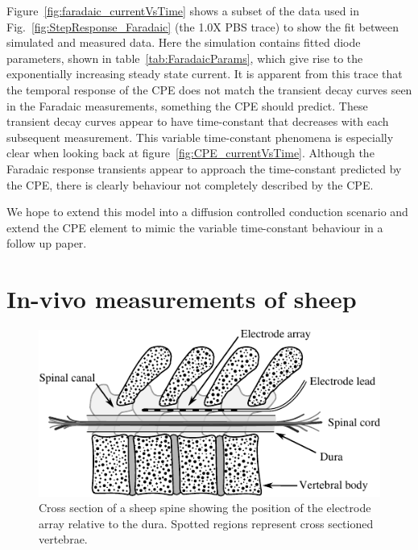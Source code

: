 \documentclass[journal, a4paper]{IEEEtran}
\begin{document}
{{
    \color{blue}
Figure~\ref{fig:faradaic_currentVsTime} shows a subset of the data used in Fig.~\ref{fig:StepResponse_Faradaic} (the 1.0X PBS trace) to show the fit between simulated and measured data. Here the simulation contains fitted diode parameters, shown in table~\ref{tab:FaradaicParams}, which give rise to the exponentially increasing steady state current.
It is apparent from this trace that the temporal response of the CPE does not match the transient decay curves seen in the Faradaic measurements, something the CPE should predict. These transient decay curves appear to have time-constant that decreases with each subsequent measurement. This variable time-constant phenomena is especially clear when looking back at figure~\ref{fig:CPE_currentVsTime}. Although the Faradaic response transients appear to approach the time-constant predicted by the CPE, there is clearly behaviour not completely described by the CPE. 

We hope to extend this model into a diffusion controlled conduction scenario and extend the CPE element to mimic the variable time-constant behaviour in a follow up paper.
}
\section{In-vivo measurements of sheep}

\begin{figure}
    \begin{center}
        \includegraphics{graphics/sheepSpine}
    \end{center}
    \caption{Cross section of a sheep spine showing the position of the electrode array relative to the dura. Spotted regions represent cross sectioned vertebrae.}
    \label{fig:sheepSpine}
\end{figure}

}
\end{document}
